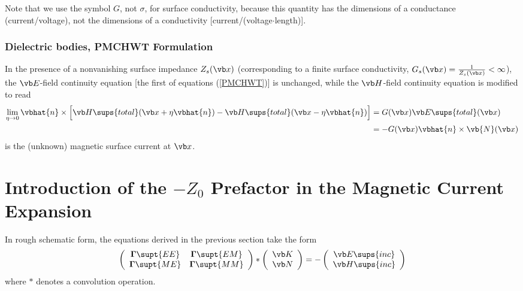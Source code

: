 Note that we use the symbol $G$, not $\sigma$, for surface
conductivity, because this quantity has the dimensions of a 
conductance (current/voltage), not the dimensions of a conductivity
[current/(voltage$\cdot$length)].

\subsubsection*{Dielectric bodies, PMCHWT Formulation} 

In the presence of a nonvanishing surface impedance $Z_s(\vb x)$
(corresponding to a finite surface conductivity, 
 $G_s(\vb x) = \frac{1}{Z_s(\vb x)} < \infty$),
the $\vb E$-field continuity equation [the first of equations
(\ref{PMCHWT})] is unchanged, while the $\vb H$-field
continuity equation is modified to read
\begin{subequations}
\begin{align}
 \lim_{\eta \to 0} \vbhat{n}\times 
 \Big[ \vb H\sups{total}(\vb x + \eta\vbhat{n})
      -\vb H\sups{total}(\vb x - \eta\vbhat{n})
 \Big] 
&= G(\vb x) \vb E\sups{total}(\vb x)
\\
&= -G(\vb x) \vbhat{n} \times \vb{N}(\vb x)
\label{DielectricEquationZS}
\end{align}
\end{subequations}
is the (unknown) magnetic surface current at $\vb x$.

\newpage
\section{Introduction of the $-Z_0$ Prefactor in the 
         Magnetic Current Expansion} 

In rough schematic form, the equations derived in the 
previous section take the form 
$$ \left( \begin{array}{cc}
   \BG\supt{EE} & \BG\supt{EM} \\
   \BG\supt{ME} & \BG\supt{MM} \\
   \end{array} \right)
   *
   \left( \begin{array}{c} \vb K \\  \vb N\end{array}\right)
   = 
   -
   \left( \begin{array}{c}
   \vb E\sups{inc} \\
   \vb H\sups{inc} \\
   \end{array}\right)
$$
where $*$ denotes a convolution operation.

